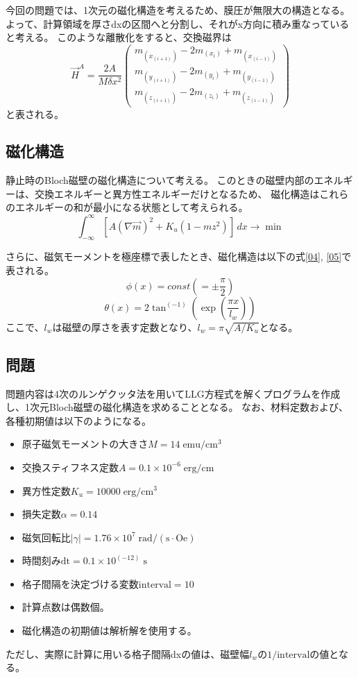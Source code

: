 \documentclass{jsarticle}
\begin{document}
今回の問題では、1次元の磁化構造を考えるため、膜圧が無限大の構造となる。
よって、計算領域を厚さdxの区間へと分割し、それがx方向に積み重なっていると考える。
このような離散化をすると、交換磁界は
\begin{equation}
	\label{03}
	\vec{H}^A = \frac{2A}{M \delta x^2}
	\begin{pmatrix}
		m_(x_(i+1)) - 2m_(x_i) + m_(x_(i-1))\\
		m_(y_(i+1)) - 2m_(y_i) + m_(y_(i-1))\\
		m_(z_(i+1)) - 2m_(z_i) + m_(z_(i-1))
	\end{pmatrix} 
\end{equation}
と表される。

\subsection{磁化構造}
静止時のBloch磁壁の磁化構造について考える。
このときの磁壁内部のエネルギーは、交換エネルギーと異方性エネルギーだけとなるため、
磁化構造はこれらのエネルギーの和が最小になる状態として考えられる。
\begin{equation}
	\int_{-\infty}^{\infty} [A(\nabla\vec{m})^2 + K_u(1-mz^2)] \,dx \rightarrow \min
\end{equation}

さらに、磁気モーメントを極座標で表したとき、磁化構造は以下の式\ref{04}, \ref{05}で表される。
\begin{equation}
	\label{04}
	\phi(x) = const(=\pm \frac{\pi}{2})
\end{equation}
\begin{equation}
	\label{05}
	\theta(x) = 2\tan ^(-1) (\exp(\frac{\pi x}{l_w}))
\end{equation}
ここで、$l_w$は磁壁の厚さを表す定数となり、$l_w=\pi\sqrt{A/K_u}$となる。

\subsection{問題}
問題内容は4次のルンゲクッタ法を用いてLLG方程式を解くプログラムを作成し、1次元Bloch磁壁の磁化構造を求めることとなる。
なお、材料定数および、各種初期値は以下のようになる。
\begin{itemize}
 \item 原子磁気モーメントの大きさ$M = 14\;\mathrm{emu/cm^3}$
 \item 交換スティフネス定数$A = 0.1\times 10^{-6}\;\mathrm{erg/cm}$
 \item 異方性定数$K_u = 10000\;\mathrm{erg/cm^3}$
 \item 損失定数$\alpha = 0.14$
 \item 磁気回転比$\lvert\gamma\rvert = 1.76\times 10^7\;\mathrm{rad/(s\cdot Oe)}$
 \item 時間刻み$\mathrm{dt} = 0.1\times 10^(-12)\;\mathrm{s}$
 \item 格子間隔を決定づける変数$\mathrm{interval} = 10$
 \item 計算点数は偶数個。
 \item 磁化構造の初期値は解析解を使用する。
\end{itemize}
ただし、実際に計算に用いる格子間隔dxの値は、磁壁幅$l_w$の$1/\mathrm{interval}$の値となる。
\end{document}
